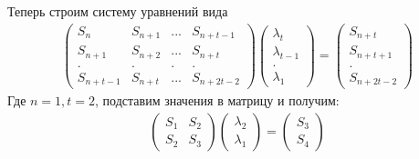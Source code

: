 \documentclass[12pt]{article}
\begin{document}
Теперь строим систему уравнений вида
\begin{gather}
    \begin{pmatrix}
        S_{n}     & S_{n+1} & {...} & S_{n+t-1}  \\
        S_{n+1}   & S_{n+2} & {...} & S_{n+t}    \\
        {.}       & {.}     & {.}   & {.}        \\
        S_{n+t-1} & S_{n+t} & {...} & S_{n+2t-2}
    \end{pmatrix}
    \begin{pmatrix}
        \lambda_{t}   \\
        \lambda_{t-1} \\
        {.}           \\
        \lambda_{1}
    \end{pmatrix}
    =
    \begin{pmatrix}
        S_{n+t}   \\
        S_{n+t+1} \\
        {.}       \\
        S_{n+2t-2}
    \end{pmatrix}
\end{gather}
Где $n=1, t=2$, подставим значения в матрицу и получим:
\begin{gather}
    \begin{pmatrix}
        S_{1} & S_{2} \\
        S_{2} & S_{3}
    \end{pmatrix}
    \begin{pmatrix}
        \lambda_{2} \\
        \lambda_{1}
    \end{pmatrix}
    =
    \begin{pmatrix}
        S_{3} \\
        S_{4}
    \end{pmatrix}
\end{gather}
\end{document}
